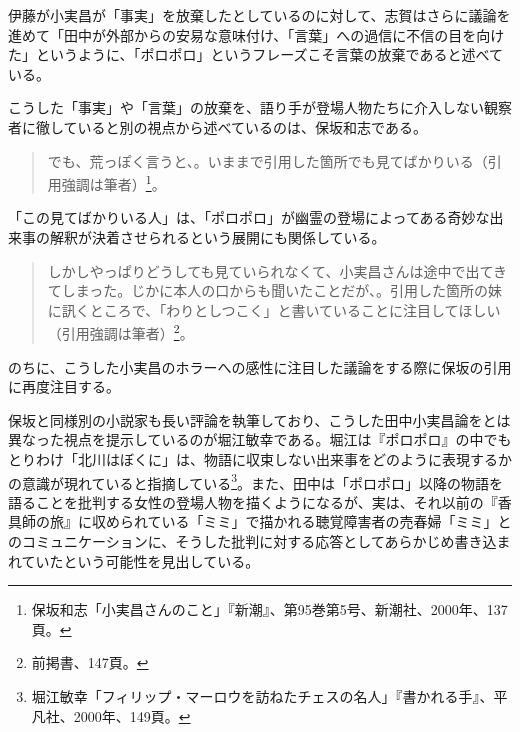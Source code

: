 伊藤が小実昌が「事実」を放棄したとしているのに対して、志賀はさらに議論を進めて「田中が外部からの安易な意味付け、「言葉」への過信に不信の目を向けた」というように、「ポロポロ」というフレーズこそ言葉の放棄であると述べている。

こうした「事実」や「言葉」の放棄を、語り手が登場人物たちに介入しない観察者に徹していると別の視点から述べているのは、保坂和志である。

\begin{quote}
  でも、荒っぽく言うと、。いままで引用した箇所でも見てばかりいる（引用強調は筆者）\footnote{保坂和志「小実昌さんのこと」『新潮』、第95巻第5号、新潮社、2000年、137頁。}。
\end{quote}

「この見てばかりいる人」は、「ポロポロ」が幽霊の登場によってある奇妙な出来事の解釈が決着させられるという展開にも関係している。

\begin{quote}
  しかしやっぱりどうしても見ていられなくて、小実昌さんは途中で出てきてしまった。じかに本人の口からも聞いたことだが、。引用した箇所の妹に訊くところで、「わりとしつこく」と書いていることに注目してほしい（引用強調は筆者）\footnote{前掲書、147頁。}。
\end{quote}

のちに、こうした小実昌のホラーへの感性に注目した議論をする際に保坂の引用に再度注目する。

保坂と同様別の小説家も長い評論を執筆しており、こうした田中小実昌論をとは異なった視点を提示しているのが堀江敏幸である。堀江は『ポロポロ』の中でもとりわけ「北川はぼくに」は、物語に収束しない出来事をどのように表現するかの意識が現れていると指摘している\footnote{堀江敏幸「フィリップ・マーロウを訪ねたチェスの名人」『書かれる手』、平凡社、2000年、149頁。}。また、田中は「ポロポロ」以降の物語を語ることを批判する女性の登場人物を描くようになるが、実は、それ以前の『香具師の旅』に収められている「ミミ」で描かれる聴覚障害者の売春婦「ミミ」とのコミュニケーションに、そうした批判に対する応答としてあらかじめ書き込まれていたという可能性を見出している。

